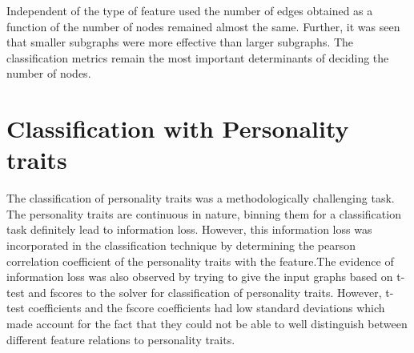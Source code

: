 \documentclass[msthesis.tex]{subfiles}
\begin{document}
Independent of the type of feature used the number of edges obtained as a function of the number of nodes remained almost the same. Further, it was seen that smaller subgraphs were more effective than larger subgraphs. The classification metrics remain the most important determinants of deciding the number of nodes. 

\section{Classification with Personality traits}
The classification of personality traits was a methodologically challenging task. The personality traits are continuous in nature, binning them for a classification task definitely lead to information loss. However, this information loss was incorporated in the classification technique by determining the pearson correlation coefficient of the personality traits with the feature.The evidence of information loss was also observed by trying to give the input graphs based on t-test and fscores to the solver for classification of personality traits. However, t-test coefficients and the fscore coefficients had low standard deviations which made account for the fact that they could not be able to well distinguish between different feature relations to personality traits. 
\end{document}
